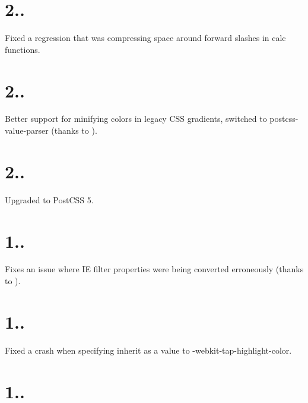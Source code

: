 \section*{2..}


\begin{DoxyItemize}
\item Fixed a regression that was compressing space around forward slashes in calc functions.
\end{DoxyItemize}

\section*{2..}


\begin{DoxyItemize}
\item Better support for minifying colors in legacy C\+SS gradients, switched to postcss-\/value-\/parser (thanks to ).
\end{DoxyItemize}

\section*{2..}


\begin{DoxyItemize}
\item Upgraded to Post\+C\+SS 5.
\end{DoxyItemize}

\section*{1..}


\begin{DoxyItemize}
\item Fixes an issue where IE filter properties were being converted erroneously (thanks to ).
\end{DoxyItemize}

\section*{1..}


\begin{DoxyItemize}
\item Fixed a crash when specifying {\ttfamily inherit} as a value to {\ttfamily -\/webkit-\/tap-\/highlight-\/color}.
\end{DoxyItemize}

\section*{1..}


